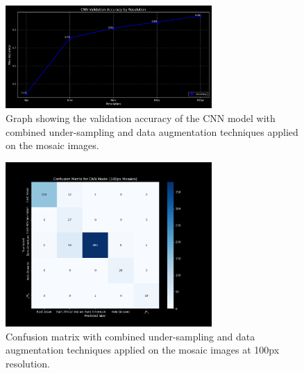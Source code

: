 \begin{appendices}
	\begin{figure}[H]
		\centering
		\includegraphics[width=0.7\textwidth]{../imgs/graphs/kfold-undersample/cnn_validation_accuracy_kfold_mosaics_line_mask_5_aug-under.png}
		\caption{Graph showing the validation accuracy of the CNN model with combined under-sampling and data augmentation
			techniques applied on the mosaic images.}
		\label{fig:combined_techniques_accuracy_mosaic}
	\end{figure}

	\begin{figure}[H]
		\centering
		\includegraphics[width=0.7\textwidth]{../imgs/graphs/kfold-undersample/cnn_confusion_matrix_kfold_mosaics_100px_mask_5_aug-under.png}
		\caption{Confusion matrix with combined under-sampling and data augmentation techniques
			applied on the mosaic images at 100px resolution.}
		\label{fig:combined_techniques_confusion_matrix_mosaic}
	\end{figure}

\end{appendices}